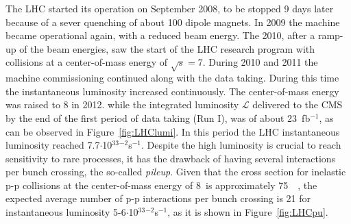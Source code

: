 The LHC started its operation on September 2008, to be stopped 9 days later
because of a sever quenching of about 100 dipole magnets. 
In 2009 the machine became operational again, with a reduced beam energy. 
The 2010, after a ramp-up of the beam energies, saw the start of the LHC research program with
collisions at a center-of-mass energy of $\sqrt{s}=$\SI{7}{\tev}.
During 2010 and 2011 the machine commissioning continued along with the data taking. 
During this time the instantaneous luminosity increased continuously. 
The center-of-mass energy was raised to \SI{8}{\tev} in 2012.
while the integrated luminosity $\mathcal{L}$ delivered to the CMS by the end of the first 
period of data taking (Run I), was of about 23~fb$^{-1}$,
as can be observed in Figure~\ref{fig:LHClumi}. In this period the
LHC instantaneous luminosity reached 7.7$\cdot$10$^{33}$\cm$^{-2}$\si{s}$^{-1}$.
Despite the high luminosity is crucial to reach sensitivity to rare
processes, it has the drawback of having several interactions per bunch crossing, 
the so-called \emph{pileup}. Given that the cross section for inelastic p-p collisions at 
the center-of-mass energy of 8~\tev is approximately 75~\mb~\cite{Antchev:2013paa},
the expected average number of p-p interactions per bunch crossing is 21 for instantaneous luminosity
5-6$\cdot$10$^{33}$\cm$^{-2}$\si{s}$^{-1}$, as it is shown in Figure~\ref{fig:LHCpu}.

